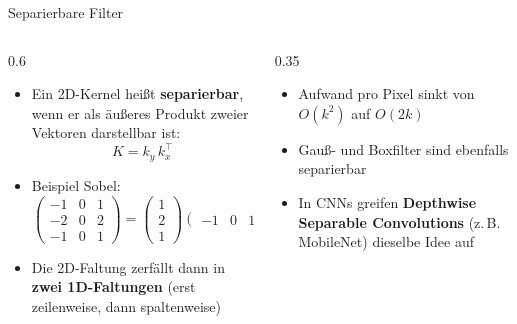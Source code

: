 {%
\begin{frame}{Separierbare Filter}
\begin{columns}
\begin{column}{0.6\textwidth}
\begin{itemize}
    \item Ein 2D-Kernel heißt \textbf{separierbar}, wenn er als äußeres Produkt zweier Vektoren darstellbar ist:
    \[
        K = k_y \, k_x^{\top}
    \]
    \item Beispiel Sobel:
    \[
        \begin{pmatrix} -1 & 0 & 1 \\ -2 & 0 & 2 \\ -1 & 0 & 1 \end{pmatrix}
        = \begin{pmatrix} 1 \\ 2 \\ 1 \end{pmatrix}
        \begin{pmatrix} -1 & 0 & 1 \end{pmatrix}
    \]
    \item Die 2D-Faltung zerfällt dann in \textbf{zwei 1D-Faltungen} (erst zeilenweise, dann spaltenweise)
\end{itemize}
\end{column}
\begin{column}{0.35\textwidth}
\begin{itemize}
    \item Aufwand pro Pixel sinkt von $O(k^2)$ auf $O(2k)$
    \item Gauß- und Boxfilter sind ebenfalls separierbar
    \item In CNNs greifen \textbf{Depthwise Separable Convolutions} (z.\,B. MobileNet) dieselbe Idee auf
\end{itemize}
\end{column}
\end{columns}
\end{frame}

}
